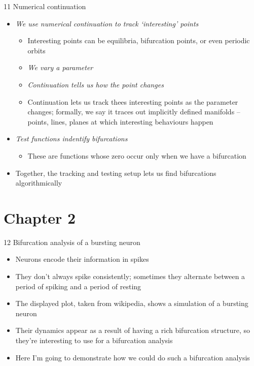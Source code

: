 \documentclass[presentation]{beamer}
\begin{document}
\begin{frame}[label={sec:org5bc2c7c}]{11 Numerical continuation}
\begin{itemize}
\item \emph{We use numerical continuation to track `interesting' points}
\begin{itemize}
\item Interesting points can be equilibria, bifurcation points, or even periodic orbits
\item \emph{We vary a parameter}
\item \emph{Continuation tells us how the point changes}
\item Continuation lets us track thees interesting points as the parameter changes; formally, we say it traces out implicitly defined manifolds -- points, lines, planes at which interesting behaviours happen
\end{itemize}
\item \emph{Test functions indentify bifurcations}
\begin{itemize}
\item These are functions whose zero occur only when we have a bifurcation
\end{itemize}
\item Together, the tracking and testing setup lets us find bifurcations algorithmically
\end{itemize}
\end{frame}


\section{Chapter 2}
\label{sec:orgaacdb9a}
\begin{frame}[label={sec:org442d74e}]{12 Bifurcation analysis of a bursting neuron}
\begin{itemize}
\item Neurons encode their information in spikes
\item They don't always spike consistently; sometimes they alternate between a period of spiking and a period of resting
\item The displayed plot, taken from wikipedia, shows a simulation of a bursting neuron
\item Their dynamics appear as a result of having a rich bifurcation structure, so they're interesting to use for a bifurcation analysis
\item Here I'm going to demonstrate how we could do such a bifurcation analysis
\end{itemize}
\end{frame}
\end{document}
